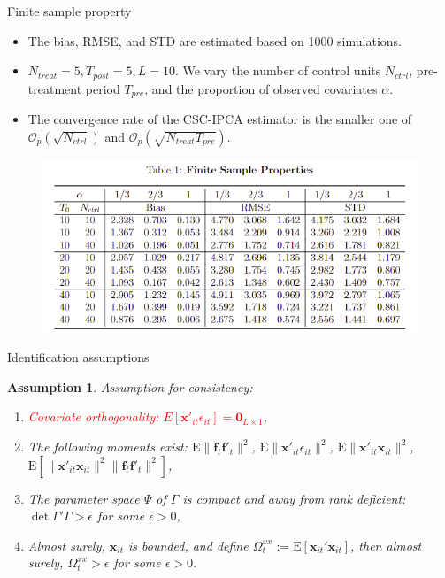 \documentclass{beamer}
\newtheorem{assumption}{Assumption}
\begin{document}
\begin{frame}{Finite sample property}
\begin{itemize}
    \item The bias, RMSE, and STD are estimated based on 1000 simulations.
    \item $N_{treat} = 5, T_{post}=5, L=10$. We vary the number of control units $N_{ctrl}$, pre-treatment period $T_{pre}$, and the proportion of observed covariates $\alpha$.
    \item The convergence rate of the CSC-IPCA estimator is the smaller one of $\mathcal{O}_p\left(\sqrt{N_{ctrl}}\right)$ and $\mathcal{O}_p\left(\sqrt{N_{treat}T_{pre}}\right)$.
\end{itemize}
\begin{figure}
    \centering
    \includegraphics[scale=0.8]{figs/finite_sample.png}
\end{figure}
\end{frame}

\begin{frame}{Identification assumptions}
\begin{assumption}
Assumption for consistency:
\begin{enumerate}
    \item \textcolor{red}{Covariate orthogonality: $E\left[\textbf{x}'_{it} \epsilon_{it}\right] = \textbf{0}_{L\times 1}$},
    
    \item The following moments exist: $\mathrm{E}\|\boldsymbol{f}_{t}\boldsymbol{f}'_{t}\|^2$, $\mathrm{E}\|\boldsymbol{x}'_{it}\epsilon_{it}\|^2$, $\mathrm{E}\|\boldsymbol{x}'_{it}\boldsymbol{x}_{it}\|^2$, $\mathrm{E}\left[\|\boldsymbol{x}'_{it}\boldsymbol{x}_{it}\|^2\|\boldsymbol{f}_{t}\boldsymbol{f}'_{t}\|^2 \right]$, 
    
    \item The parameter space $\Psi$ of $\Gamma$ is compact and away from rank deficient: $\det{\Gamma' \Gamma} > \epsilon$ for some $\epsilon>0$,
    
    \item Almost surely, $\boldsymbol{x}_{it}$ is bounded, and define $\Omega_t^{xx} := \mathrm{E}\left[ \boldsymbol{x}_{it}' \boldsymbol{x}_{it} \right]$, then almost surely, $\Omega_t^{xx} > \epsilon$ for some $\epsilon > 0$.
\end{enumerate}
\end{assumption}
\end{frame}
\end{document}
